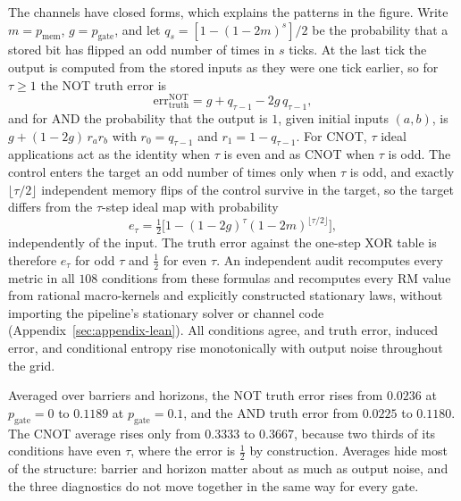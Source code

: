 The channels have closed forms, which explains the patterns in the figure. Write \(m=p_{\mathrm{mem}}\), \(g=p_{\mathrm{gate}}\), and let \(q_s=[1-(1-2m)^s]/2\) be the probability that a stored bit has flipped an odd number of times in \(s\) ticks. At the last tick the output is computed from the stored inputs as they were one tick earlier, so for \(\tau\ge1\) the NOT truth error is
\[
\mathrm{err}_{\mathrm{truth}}^{\mathrm{NOT}} = g+q_{\tau-1}-2g\,q_{\tau-1},
\]
and for AND the probability that the output is \(1\), given initial inputs \((a,b)\), is \(g+(1-2g)\,r_a r_b\) with \(r_0=q_{\tau-1}\) and \(r_1=1-q_{\tau-1}\). For CNOT, \(\tau\) ideal applications act as the identity when \(\tau\) is even and as CNOT when \(\tau\) is odd. The control enters the target an odd number of times only when \(\tau\) is odd, and exactly \(\lfloor \tau/2\rfloor\) independent memory flips of the control survive in the target, so the target differs from the \(\tau\)-step ideal map with probability
\[
e_\tau=\tfrac12\bigl[1-(1-2g)^{\tau}(1-2m)^{\lfloor\tau/2\rfloor}\bigr],
\]
independently of the input. The truth error against the one-step XOR table is therefore \(e_\tau\) for odd \(\tau\) and \(\tfrac12\) for even \(\tau\). An independent audit recomputes every metric in all \(108\) conditions from these formulas and recomputes every RM value from rational macro-kernels and explicitly constructed stationary laws, without importing the pipeline's stationary solver or channel code (Appendix~\ref{sec:appendix-lean}). All conditions agree, and truth error, induced error, and conditional entropy rise monotonically with output noise throughout the grid.

Averaged over barriers and horizons, the NOT truth error rises from \(0.0236\) at \(p_{\mathrm{gate}}=0\) to \(0.1189\) at \(p_{\mathrm{gate}}=0.1\), and the AND truth error from \(0.0225\) to \(0.1180\). The CNOT average rises only from \(0.3333\) to \(0.3667\), because two thirds of its conditions have even \(\tau\), where the error is \(\tfrac12\) by construction. Averages hide most of the structure: barrier and horizon matter about as much as output noise, and the three diagnostics do not move together in the same way for every gate.

